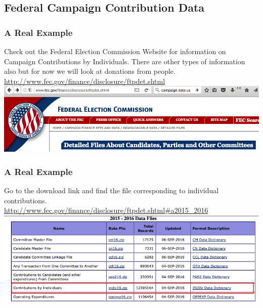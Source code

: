 \documentclass{beamer}
\begin{document}
%

%
\subsection{Federal Campaign Contribution Data}
\begin{frame}[fragile]
\frametitle{A Real Example}Check out the Federal Election Commission Website for information on Campaign Contributions by Individuals. There are other types of information also but for now we will look at donations from people.
\newline
\\
\url{http://www.fec.gov/finance/disclosure/ftpdet.shtml}
\newline
\includegraphics{../IMG/election_website.png}
\end{frame}

% 

\begin{frame}[fragile]
\frametitle{A Real Example} Go to the download link and find the file corresponding to individual contributions.
\newline
\\
\footnotesize
\url{http://www.fec.gov/finance/disclosure/ftpdet.shtml#a2015_2016}
\newline
\includegraphics{../IMG/campaign.png}
\end{frame}

%
\end{document}
